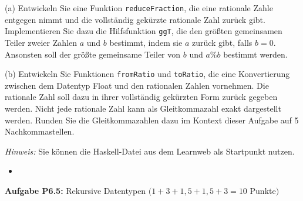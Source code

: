 (a) Entwickeln Sie eine Funktion \texttt{reduceFraction}, die eine rationale Zahle 
entgegen nimmt und die vollständig gekürzte rationale Zahl zurück gibt. Implementieren Sie dazu 
die Hilfsfunktion \texttt{ggT}, die den größten gemeinsamen Teiler zweier Zahlen $a$ und $b$ bestimmt, 
indem sie $a$ zurück gibt, falls $b=0$. Ansonsten soll der größte gemeinsame Teiler von $b$ und 
$a \% b$ bestimmt werden.

(b) Entwickeln Sie Funktionen \texttt{fromRatio} und \texttt{toRatio}, 
die eine Konvertierung zwischen dem 
Datentyp Float und den rationalen Zahlen vornehmen. Die rationale Zahl soll dazu in ihrer 
vollständig gekürzten Form zurück gegeben werden. Nicht jede rationale Zahl kann als 
Gleitkommazahl exakt dargestellt werden. Runden Sie die Gleitkommazahlen dazu im Kontext 
dieser Aufgabe auf 5 Nachkommastellen.

\textit{Hinweis:} Sie können die Haskell-Datei aus dem Learnweb als Startpunkt nutzen.

\begin{itemize}
  \item []\inputminted{Haskell}{A6_4.hs}
\end{itemize}

\newpage

\textbf{ Aufgabe P6.5:} Rekursive Datentypen $(1+3+1,5+1,5+3=10$ Punkte$)$ 

